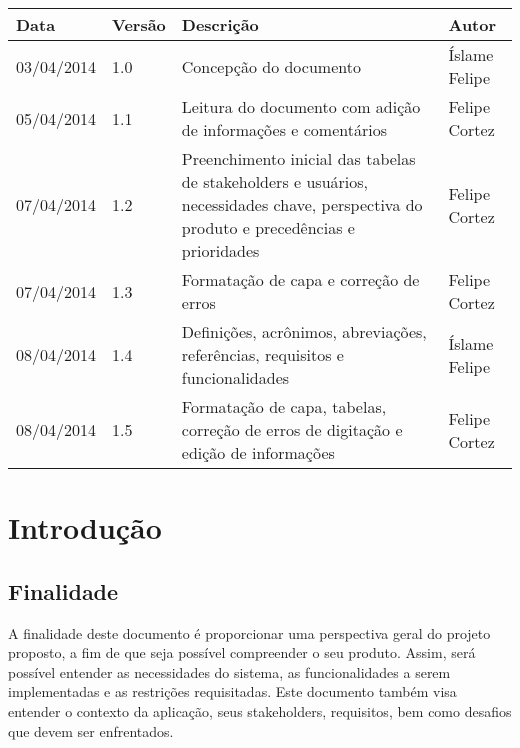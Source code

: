 \documentclass[12pt, a4paper]{article}
\begin{document}
    \begin{tabu}{X[-1] | X[-1, r] | X | X[-1]}
        \hline
        \textbf{Data} &
        \textbf{Versão} &
        \textbf{Descrição} &
        \textbf{Autor}
        \\ \hline

        03/04/2014 &
        1.0 &
        Concepção do documento &
        Íslame Felipe
        \\ \hline

        05/04/2014 &
        1.1 &
        Leitura do documento com adição de informações e comentários &
        Felipe Cortez
        \\ \hline

        07/04/2014 &
        1.2 &
        Preenchimento inicial das tabelas de stakeholders e usuários,
        necessidades chave, perspectiva do produto e precedências e prioridades
        &
        Felipe Cortez
        \\ \hline

        07/04/2014 &
        1.3 &
        Formatação de capa e correção de erros &
        Felipe Cortez
        \\ \hline

        08/04/2014 &
        1.4 &
        Definições, acrônimos, abreviações, referências, requisitos e funcionalidades &
        Íslame Felipe
        \\ \hline

        08/04/2014 &
        1.5 &
        Formatação de capa, tabelas, correção de erros de digitação e edição de
        informações &
        Felipe Cortez
        \\ \hline
    \end{tabu}

    \newpage

    \tableofcontents

    \newpage

    \section{Introdução}
        \subsection{Finalidade}
        A finalidade deste documento é proporcionar uma perspectiva geral do
        projeto proposto, a fim de que seja possível compreender o seu produto.
        Assim, será possível entender as necessidades do sistema, as
        funcionalidades a serem implementadas e as restrições requisitadas.
        Este documento também visa entender o contexto da aplicação, seus
        stakeholders, requisitos, bem como desafios que devem ser enfrentados.
\end{document}
